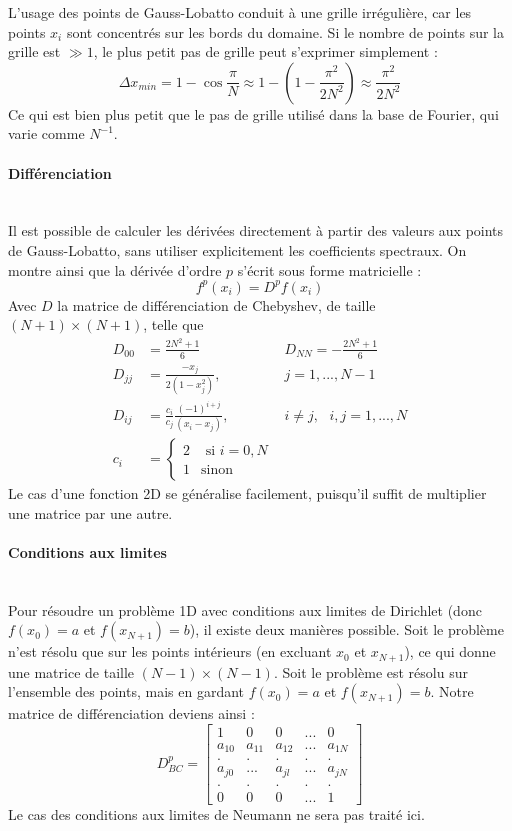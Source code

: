 L'usage des points de Gauss-Lobatto conduit à une grille irrégulière, car les points $x_i$ sont concentrés sur les bords du domaine. Si le nombre de points sur la grille est $\gg 1$, le plus petit pas de grille peut s'exprimer simplement : 
\begin{equation}
	\Delta x_{min} = 1-\cos{\frac{\pi}{N}}\approx 1-(1-\frac{\pi^2}{2N^2}) \approx \frac{\pi^2}{2N^2}
\end{equation}
Ce qui est bien plus petit que le pas de grille utilisé dans la base de Fourier, qui varie comme $N^{-1}$.
\paragraph{Différenciation}~\\
Il est possible de calculer les dérivées directement à partir des valeurs aux points de Gauss-Lobatto, sans utiliser explicitement les coefficients spectraux.
On montre ainsi que la dérivée d'ordre $p$ s'écrit sous forme matricielle  : 
\begin{equation}
	f^{p}(x_i) = D^{p} f(x_i)
\end{equation}
Avec $D$ la matrice de différenciation de Chebyshev, de taille $(N+1)\times (N+1)$, telle que 
\begin{align}
	D_{00} &= \frac{2N^2+1}{6} & D_{NN} = -\frac{2N^2+1}{6} \\
	D_{jj} &= \frac{-x_j}{2(1-x_j^2)},& j = 1,...,N-1\\
	D_{ij} &= \frac{c_i}{c_j}\frac{(-1)^{i+j}}{(x_i-x_j)}, & i\neq j, \text{   } i,j=1,...,N\\
	c_i  &= 
	\begin{cases}
		2&\text{ si } i =0, N\\
		1&\text{sinon}	
	\end{cases}
\end{align}
Le cas d'une fonction 2D se généralise facilement, puisqu'il suffit de multiplier une matrice par une autre.

\paragraph{Conditions aux limites}~\\
Pour résoudre un problème 1D avec conditions aux limites de Dirichlet (donc $f(x_0) = a$ et $f(x_{N+1}) = b$), il existe deux manières possible. Soit le problème n'est résolu que sur les points intérieurs (en excluant $x_0$ et $x_{N+1}$), ce qui donne une matrice de taille $(N-1)\times(N-1)$. Soit le problème est résolu sur l'ensemble des points, mais en gardant $f(x_0) = a$ et $f(x_{N+1}) = b$. Notre matrice de différenciation deviens ainsi : 
\begin{equation}
	D^p_{BC}=
	\begin{bmatrix}
		1 & 0 & 0 &...&0\\
		a_{10} & a_{11} & a_{12} &... &a_{1N}\\
		.&.&.&.&.\\
		a_{j0}& ...&a_{jl}&...&a_{jN}\\
		.&.&.&.&.\\
		0&0&0&...& 1
	\end{bmatrix}
	\label{eq:mat_Cheb_BCs}
\end{equation}
Le cas des conditions aux limites de Neumann ne sera pas traité ici.
